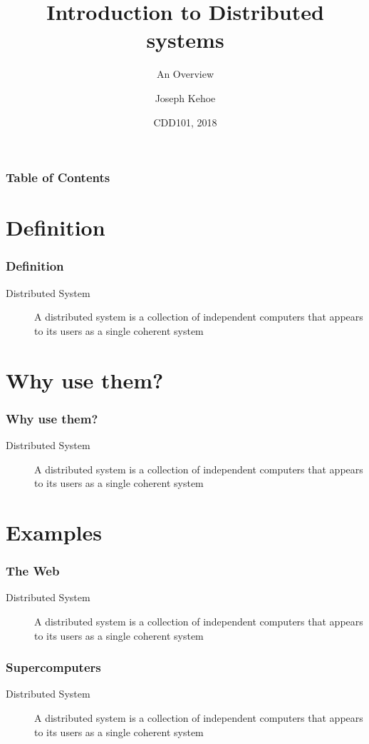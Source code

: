 \documentclass{beamer}
\title[Distributed Systems] %
{Introduction to Distributed systems}
\subtitle{An Overview}
\author[Dr. Joseph Kehoe] %
{Joseph Kehoe\inst{1}}
\institute[IT Carlow] %
{
	\inst{1}%
	Department of Computing and Networking\\
	Institute of Technology Carlow
}
\date[ITC 2018] %
{CDD101, 2018}
\begin{document}
 
\frame{\titlepage}
 
 
 
 \begin{frame}
 	\frametitle{Table of Contents}
 	\tableofcontents
 \end{frame}
 
 
 \section{Definition}
 

  \begin{frame}
  	\frametitle{Definition}
  	\begin{description}
  		\item[Distributed System] A distributed system is a collection of independent computers that appears to its users as a single coherent system
  	\end{description}
  \end{frame}

\section{Why use them?}
  \begin{frame}
  	\frametitle{Why use them?}
  	\begin{description}
  		\item[Distributed System] A distributed system is a collection of independent computers that appears to its users as a single coherent system
  	\end{description}
  \end{frame}
\section{Examples}
  \begin{frame}
  	\frametitle{The Web}
  	\begin{description}
  		\item[Distributed System] A distributed system is a collection of independent computers that appears to its users as a single coherent system
  	\end{description}
  \end{frame}
    \begin{frame}
    	\frametitle{Supercomputers}
    	\begin{description}
    		\item[Distributed System] A distributed system is a collection of independent computers that appears to its users as a single coherent system
    	\end{description}
    \end{frame}
\end{document}
